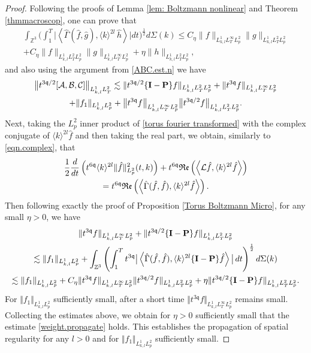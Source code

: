 \documentclass[reqno]{amsart}
\newcommand{\pv}{p}
\def\norm#1{\big\Vert#1\big\Vert}
\newcommand{\irnp}[2]{\left\langle {#1},{#2} \right\rangle}
\newcommand{\qq}{\mathfrak{q}}
\newcommand{\tTq}{t^{3\qq}}
\newcommand{\tQQq}{t^{6\qq}}
\newcommand{\linL}{\mathcal{L}}
\newcommand{\micro}{{\bf \{I- P\}}}
\newcommand{\Z}{\mathbb{Z}}
\newcommand{\real}[1]{\mathfrak{Re}\left(#1\right)}
\theoremstyle{definition}
\numberwithin{equation}{section}
\numberwithin{theorem}{section}
\begin{document}
\begin{proof}
Following the proofs of Lemma \ref{lem: Boltzmann nonlinear} and Theorem \ref{thmmacroscop}, one can prove that
\begin{multline*}
        \int_{\Z^3}\bigg(\int_{1}^{T} \big|\irnp{\hat{\Gamma}(\hat{f},\hat{g})}{\langle  k \rangle^{2l}\,\hat{h}}\big| dt \bigg)^{\frac{1}{2}}d\Sigma(k)
        \leq C_{\eta} \|f\|_{L^1_{k,l}L^{\infty}_TL^2_p}\|g\|_{L^1_{k,l}L^{2}_TL^2_p}
        \\
+C_{\eta} \|f\|_{L^1_{k,l}L^{2}_TL^2_p}\|g\|_{L^1_{k,l}L^{\infty}_TL^2_p}+\eta\|h\|_{L^1_{k,l}L^{2}_TL^2_p},
\end{multline*}
and also using the argument from \eqref{ABC.est.n} we have
\begin{multline*}
\norm{t^{3\qq/2} [\mathcal{A},\mathcal{B},\mathcal{C}]}_{L^1_{k,l} L^2_T} \lesssim
\Vert t^{3\qq/2}\micro f \Vert_{L^1_{k,l} L^2_T L^2_{\pv}} +\Vert \tTq f \Vert_{L^1_{k,l} L^\infty_T L^2_{\pv}} 
\\ 
+ \Vert f_1 \Vert_{L^1_{k,l} L^2_{\pv}} 
+ 
\norm{\tTq{f}}_{L^1_{k,l}L^\infty_TL^2_{\pv}} \norm{t^{3\qq/2}{f}}_{L^1_{k,l}L^2_TL^2_{\pv}}.
\end{multline*}
Next, taking the \(L^2_p\) inner product of \eqref{torus fourier transformed} with the complex conjugate of \(\langle k \rangle^{2l}\hat{f}\) and then taking the real part, we obtain, similarly to \eqref{eqn.complex}, that
\begin{multline}\notag
        \frac{1}{2}\frac{d}{dt}  \left( \tQQq \langle k \rangle^{2l}
\Vert \hat{f}\Vert_{L^2_{\pv}}^2(t,k)  \right)+ \tQQq\real{\irnp{\linL\hat{f}}{\langle k \rangle^{2l}\hat{f}}}
\\
= \tQQq\real{\irnp{\hat{\Gamma}(\hat{f},\hat{f})}{\langle k \rangle^{2l}\hat{f}}}.
\end{multline}
Then following exactly the proof of Proposition \ref{Torus Boltzmann Micro}, for any small \(\eta>0\), we have 
\begin{multline*}
{\Vert{\tTq f}\Vert_{L^1_{k,l}L^\infty_TL^2_{\pv}}} 
+ 
\|t^{3\qq/2}\micro f\|_{L^1_{k,l}L^2_TL^2_p}
\\
\lesssim 
\Vert  {f}_1\Vert_{L^1_{k,l}L^2_{\pv}}
+ 
\int_{\Z^3} \left(\int^T_1 \tTq\big|\irnp{\hat{\Gamma}(\hat{f},\hat{f})}{\langle k \rangle^{2l}\micro\hat{f}}\big|\,dt\right)^{\frac12}d\Sigma(k)
\\ 
\lesssim 
\Vert  {f}_1\Vert_{L^1_{k,l}L^2_{\pv}}
+
C_{\eta}
{\Vert{\tTq f}\Vert_{L^1_{k,l}L^\infty_TL^2_{\pv}}} 
\Vert t^{3\qq/2} {f}\Vert_{L^1_{k,l}L^2_TL^2_{\pv}}
+
\eta
\|t^{3\qq/2}\micro f\|_{L^1_{k,l}L^2_TL^2_p}.
\end{multline*}
For $\Vert  {f}_1\Vert_{L^1_{k,l}L^2_{\pv}}$ sufficiently small, after a short time ${\Vert{\tTq f}\Vert_{L^1_{k,l}L^\infty_TL^2_{\pv}}}$ remains small.  Collecting the estimates above, we obtain for $\eta>0$ sufficiently small that the estimate \eqref{weight.propagate} holds. This establishes the propagation of spatial regularity for any $l>0$ and for $\Vert {f}_1\Vert_{L^1_{k,l}L^2_{\pv}}$ sufficiently small.
\end{proof}
\end{document}
